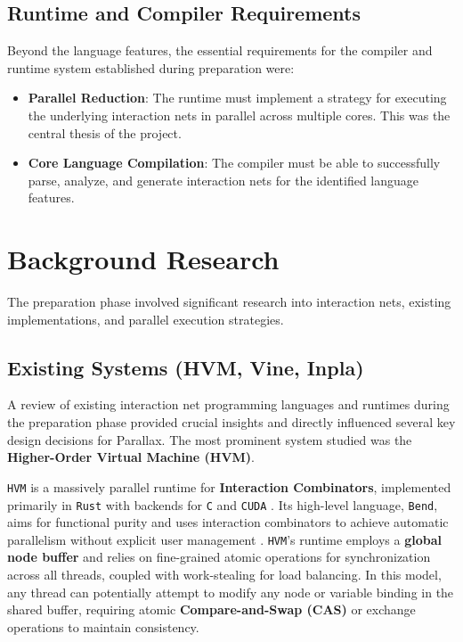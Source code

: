\subsection{Runtime and Compiler Requirements}
Beyond the language features, the essential requirements for the compiler and runtime system established during preparation were:
\begin{itemize}
    \item \textbf{Parallel Reduction}: The runtime must implement a strategy for executing the underlying interaction nets in parallel across multiple cores. This was the central thesis of the project.
    \item \textbf{Core Language Compilation}: The compiler must be able to successfully parse, analyze, and generate interaction nets for the identified language features.
\end{itemize}

\section{Background Research}

The preparation phase involved significant research into interaction nets, existing implementations, and parallel execution strategies.

\subsection{Existing Systems (HVM, Vine, Inpla)}\label{sec:prep_existing_systems}

A review of existing interaction net programming languages and runtimes during the preparation phase provided crucial insights and directly influenced several key design decisions for Parallax. The most prominent system studied was the \textbf{Higher-Order Virtual Machine (HVM)}.

\texttt{HVM} is a massively parallel runtime for \textbf{Interaction Combinators}, implemented primarily in \texttt{Rust} with backends for \texttt{C} and \texttt{CUDA} \cite{HVMGithub}. Its high-level language, \texttt{Bend}, aims for functional purity and uses interaction combinators to achieve automatic parallelism without explicit user management \cite{BendGithub}. \texttt{HVM}'s runtime employs a \textbf{global node buffer} and relies on fine-grained atomic operations for synchronization across all threads, coupled with work-stealing for load balancing. In this model, any thread can potentially attempt to modify any node or variable binding in the shared buffer, requiring atomic \textbf{Compare-and-Swap (CAS)} or exchange operations to maintain consistency.

